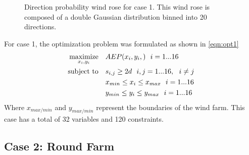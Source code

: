 \documentclass[a4paper]{jpconf}
\begin{document}
\begin{figure}[h!]
\begin{minipage}[t]{18pc}
\caption{Direction probability wind rose for case 1. This wind rose is composed of a double Gaussian distribution binned into 20 directions.}
\label{fig:directional}
\end{minipage} 
\end{figure}
%

For case 1, the optimization problem was formulated as shown in \cref{eqn:opt1}
%
\begin{equation}
	\label{eqn:opt1}
	\begin{aligned} [b]
	\underset{x_i,y_i}{\textrm{maximize}} \quad & AEP(x_i,y_i,)~~i=1...16\\
	\textrm{subject to} \quad & s_{i,j} \geq 2\*d~~i,j=1...16,~~i \neq j\\
	 & x_{min} \leq x_i \leq x_{max}~~i=1...16\\
     & y_{min} \leq y_i \leq y_{max}~~i=1...16
	\end{aligned}
\end{equation}
%
Where $x_{max/min}$ and $y_{max/min}$ represent the boundaries of the wind farm. This case has a total of 32 variables and 120 constraints.

\subsection{Case 2: Round Farm}
\end{document}
